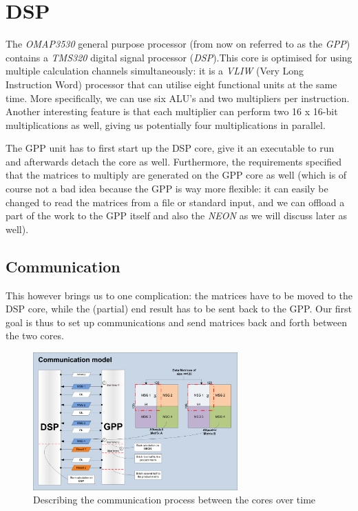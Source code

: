 \section{DSP}
The \emph{OMAP3530} general purpose processor (from now on referred to as the
\emph{GPP}) contains a \emph{TMS320} digital signal processor (\emph{DSP}).This
core is optimised for using multiple calculation channels simultaneously: it is
a \emph{VLIW} (Very Long Instruction Word) processor that can utilise eight
functional units at the same time. More specifically, we can use six ALU's and
two multipliers per instruction. Another interesting feature is that each
multiplier can perform two 16 x 16-bit multiplications as well, giving us
potentially four multiplications in parallel.

The GPP unit has to first start up the DSP core, give it an executable to run
and afterwards detach the core as well. Furthermore, the requirements specified
that the matrices to multiply are generated on the GPP core as well (which is 
of course not a bad idea because the GPP is way more flexible: it can easily
be changed to read the matrices from a file or standard input, and we can
offload a part of the work to the GPP itself and also the \emph{NEON} as we 
will discuss later as well). 

\subsection{Communication}
This however brings us to one complication: the matrices have to be moved to
the DSP core, while the (partial) end result has to be sent back to the GPP.
Our first goal is thus to set up communications and send matrices back and forth
between the two cores. 

\begin{figure}[h]
\includegraphics[width=0.7\textwidth]{gpp_dsp_com}
\caption{Describing the communication process between the cores over time}
\label{fig:gpp_dsp_com}
\end{figure}

